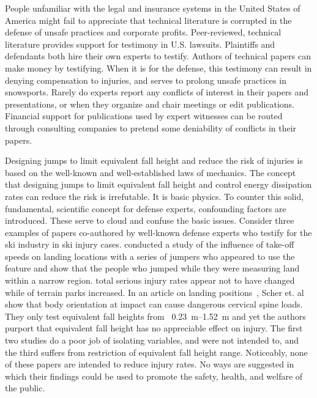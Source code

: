 \documentclass{article}
\begin{document}
People unfamiliar with the legal and insurance systems in the United States of
America might fail to appreciate that technical literature is corrupted in the
defense of unsafe practices and corporate profits. Peer-reviewed, technical
literature provides support for testimony in U.S. lawsuits. Plaintiffs and
defendants both hire their own experts to testify. Authors of technical papers
can make money by testifying. When it is for the defense, this testimony can
result in denying compensation to injuries, and serves to prolong unsafe
practices in snowsports. Rarely do experts report any conflicts of interest in
their papers and presentations, or when they organize and chair meetings or
edit publications. Financial support for publications used by expert witnesses
can be routed through consulting companies to pretend some deniability of
conflicts in their papers.

Designing jumps to limit equivalent fall height and reduce the risk of injuries
is based on the well-known and well-established laws of mechanics. The concept
that designing jumps to limit equivalent fall height and control energy
dissipation rates can reduce the risk is irrefutable. It is basic physics. To
counter this solid, fundamental, scientific concept for defense experts,
confounding factors are introduced. These serve to cloud and confuse the basic
issues. Consider three examples of papers co-authored by well-known defense
experts who testify for the ski industry in ski injury cases. \cite{Shealy2010}
conducted a study of the influence of take-off speeds on landing locations with
a series of jumpers who appeared to use the feature and show that the people
who jumped while they were measuring land within a narrow region.
\cite{Shealy2015} total serious injury rates appear not to have changed while
of terrain parks increased. In an article on landing
positions~\cite{Scher2015}, Scher et. al show that body orientation at impact
can cause dangerous cervical spine loads. They only test equivalent fall
heights from ~\SIrange{0.23}{1.52}{\meter} and yet the authors purport that
equivalent fall height has no appreciable effect on injury. The first two
studies do a poor job of isolating variables, and were not intended to, and the
third suffers from restriction of equivalent fall height range. Noticeably,
none of these papers are intended to reduce injury rates. No ways are suggested
in which their findings could be used to promote the safety, health, and
welfare of the public.
\end{document}
